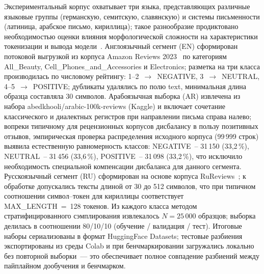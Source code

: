 Экспериментальный корпус охватывает три языка, представляющих различные языковые группы (германскую, семитскую, славянскую) и системы письменности (латиница, арабское письмо, кириллица); такое разнообразие продиктовано необходимостью оценки влияния морфологической сложности на характеристики токенизации и вывода модели~\cite{li2024multilingual}. Англоязычный сегмент (EN) сформирован потоковой выгрузкой из корпуса Amazon Reviews 2023~\cite{hou2024amazon} по категориям All\_Beauty, Cell\_Phones\_and\_Accessories и Electronics; разметка на три класса производилась по числовому рейтингу: 1–2~$\rightarrow$~NEGATIVE, 3~$\rightarrow$~NEUTRAL, 4–5~$\rightarrow$~POSITIVE; дубликаты удалялись по полю text, минимальная длина образца составляла 30 символов. Арабоязычная выборка (AR) извлечена из набора abedkhooli/arabic-100k-reviews (Kaggle) и включает сочетание классического и диалектных регистров при направлении письма справа налево; вопреки типичному для рецензионных корпусов дисбалансу в пользу позитивных отзывов, эмпирическая проверка распределения исходного корпуса (99\,999 строк) выявила естественную равномерность классов: NEGATIVE~– 31\,150 (33{,}2\,\%), NEUTRAL~– 31\,456 (33{,}6\,\%), POSITIVE~– 31\,098 (33{,}2\,\%), что исключило необходимость специальной компенсации дисбаланса для данного сегмента. Русскоязычный сегмент (RU) сформирован на основе корпуса RuReviews~\cite{smetanin2019rureviews}; к обработке допускались тексты длиной от 30 до 512 символов, что при типичном соотношении символ–токен для кириллицы соответствует MAX\_LENGTH~=~128 токенов. Из каждого класса методом стратифицированного сэмплирования извлекалось $N = 25\,000$ образцов; выборка делилась в соотношении 80/10/10 (обучение / валидация / тест). Итоговые наборы сериализованы в формат HuggingFace Datasets; тестовые разбиения экспортированы из среды Colab и при бенчмаркировании загружались локально без повторной выборки~— это обеспечивает полное совпадение разбиений между пайплайном дообучения и бенчмарком.

